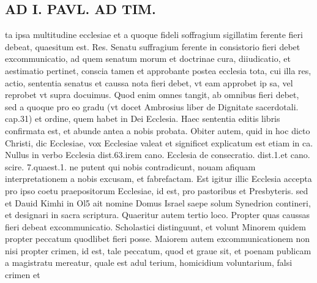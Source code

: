 \documentclass{article}
\begin{document}
\begin{pages}
\section*{AD I. PAVL. AD TIM. }
\marginpar{[ p.334 ]}\pstart ta ipsa multitudine ecclesiae et a quoque fideli soffragium sigillatim ferente fieri debeat, quaesitum est. Res. Senatu suffragium ferente in consistorio fieri debet excommunicatio, ad quem senatum morum et doctrinae cura, diiudicatio, et aestimatio pertinet, conscia tamen et approbante postea ecclesia tota, cui illa res, actio, sententia senatus et caussa nota fieri debet, vt eam approbet ip sa, vel reprobet vt supra docuimus. Quod enim omnes tangit, ab omnibus fieri debet, sed a quoque pro eo gradu (vt docet Ambrosius liber  de Dignitate sacerdotali. cap.31) et ordine, quem habet in Dei Ecclesia. Haec sententia editis libris confirmata est, et abunde antea a nobis probata. Obiter autem, quid in hoc dicto Christi, dic Ecclesiae, vox Ecclesiae valeat et significet explicatum est etiam in ca. Nullus in verbo Ecclesia dist.63.irem cano. Ecclesia de consecratio. dist.1.et cano. scire. 7.quaest.1. ne putent qui nobis contradicunt, nouam afiquam interpretationem a nobis excusam, et fabrefactam. Est igitur illic Ecclesia accepta pro ipso coetu praepositorum Ecclesiae, id est, pro pastoribus et Presbyteris. sed et Dauid Kimhi in Ol5 ait nomine Domus Israel saepe solum Synedrion contineri, et designari in sacra scriptura.  \pend\pstart Quaeritur autem tertio loco. Propter quas caussas fieri debeat excommunicatio. Scholastici distinguunt, et volunt Minorem quidem propter peccatum quodlibet fieri posse. Maiorem autem excommunicationem non nisi propter crimen, id est, tale peccatum, quod et graue sit, et poenam publicam a magistratu mereatur, quale est adul terium, homicidium voluntarium, falsi crimen et  \pend

\end{pages}
\end{document}
